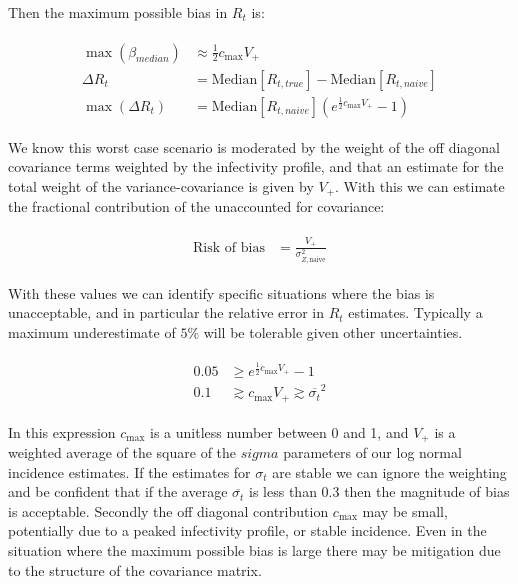 \documentclass[a4paper, 12pt, twoside]{article}
\begin{document}
Then the maximum possible bias in $ R_t $ is:

\begin{eqnarray}
\begin{aligned}
\max(\beta_{median}) &\approx \frac{1}{2} c_{\text{max}} V_+ \\
\Delta R_t &= \text{Median}[R_{t,true}] - \text{Median}[R_{t,naive}] \\
\max(\Delta R_t) &= \text{Median}[R_{t,naive}] ( e^{ \frac{1}{2} c_{\text{max}} V_+} -1  )
\end{aligned}
\end{eqnarray}

We know this worst case scenario is moderated by the weight of the off diagonal covariance terms weighted by the infectivity profile, and that an estimate for the total weight of the variance-covariance is given by $V_+$. With this we can estimate the fractional contribution of the unaccounted for covariance:

\begin{eqnarray}
\begin{aligned}
\text{Risk of bias} &= \frac{V_+}{\sigma_{Z,\text{naive}}^2}
\end{aligned}
\end{eqnarray}

With these values we can identify specific situations where the bias is unacceptable, and in particular the relative error in $R_t$ estimates. Typically a maximum underestimate of $5\%$ will be tolerable given other uncertainties.

\begin{eqnarray}
\begin{aligned}
0.05 &\ge e^{ \frac{1}{2} c_{\text{max}} V_+} -1 \\
0.1 &\gtrsim c_{\text{max}} V_+ \gtrsim \overline{\sigma_t}^2
\end{aligned}
\end{eqnarray}

In this expression $c_{\text{max}}$ is a unitless number between 0 and 1, and $V_+$ is a weighted average of the square of the $sigma$ parameters of our log normal incidence estimates. If the estimates for $\sigma_t$ are stable we can ignore the weighting and be confident that if the average $\overline{\sigma_t}$ is less than 0.3 then the magnitude of bias is acceptable. Secondly the off diagonal contribution $ c_{\text{max}} $ may be small, potentially due to a peaked infectivity profile, or stable incidence. Even in the situation where the maximum possible bias is large there may be mitigation due to the structure of the covariance matrix.
\end{document}
